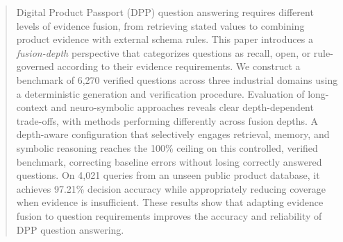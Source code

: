 \documentclass[conference]{IEEEtran}
\newcommand{\revg}[1]{\textcolor{reviewgreen}{#1}}
\begin{document}
\begin{abstract}
Digital Product Passport (DPP) question answering requires different levels of evidence fusion, from retrieving stated values to combining product evidence with external schema rules. This paper introduces a \emph{fusion-depth} perspective that categorizes questions as recall, open, or rule-governed according to their evidence requirements. We construct a benchmark of 6,270 verified questions across three industrial domains using a deterministic generation and verification procedure. Evaluation of long-context and neuro-symbolic approaches reveals clear depth-dependent trade-offs, with methods performing differently \revg{across fusion depths}. A depth-aware configuration that selectively engages retrieval, memory, and symbolic reasoning \revg{reaches the 100\% ceiling on this controlled, verified benchmark}, correcting baseline errors without losing correctly answered questions. On 4,021 queries from an unseen public product database, it achieves 97.21\% decision accuracy while appropriately reducing coverage when evidence is insufficient. These results show that adapting evidence fusion to question requirements improves the accuracy and reliability of DPP question answering.

\end{abstract}
\end{document}
